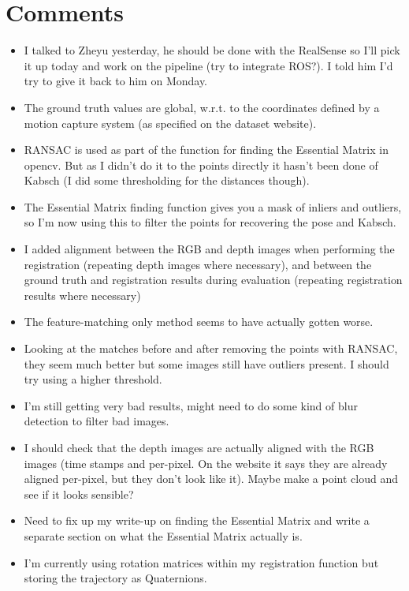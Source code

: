 \documentclass[12pt,a4paper]{article}
\begin{document}
\section{Comments}
\begin{itemize}
\item I talked to Zheyu yesterday, he should be done with the RealSense so I'll pick it up today and work on the pipeline (try to integrate ROS?). I told him I'd try to give it back to him on Monday.
\item The ground truth values are global, w.r.t. to the coordinates defined by a motion capture system (as specified on the dataset website).
\item RANSAC is used as part of the function for finding the Essential Matrix in opencv. But as I didn't do it to the points directly it hasn't been done of Kabsch (I did some thresholding for the distances though).
\item The Essential Matrix finding function gives you a mask of inliers and outliers, so I'm now using this to filter the points for recovering the pose and Kabsch.
\item I added alignment between the RGB and depth images when performing the registration (repeating depth images where necessary), and between the ground truth and registration results during evaluation (repeating registration results where necessary)
\item The feature-matching only method seems to have actually gotten worse.
\item Looking at the matches before and after removing the points with RANSAC, they seem much better but some images still have outliers present. I should try using a higher threshold. 
\item I'm still getting very bad results, might need to do some kind of blur detection to filter bad images. 
\item I should check that the depth images are actually aligned with the RGB images (time stamps and per-pixel. On the website it says they are already aligned per-pixel, but they don't look like it). Maybe make a point cloud and see if it looks sensible?
\item Need to fix up my write-up on finding the Essential Matrix and write a separate section on what the Essential Matrix actually is.
\item I'm currently using rotation matrices within my registration function but storing the trajectory as Quaternions.
\end{itemize}
\end{document}
